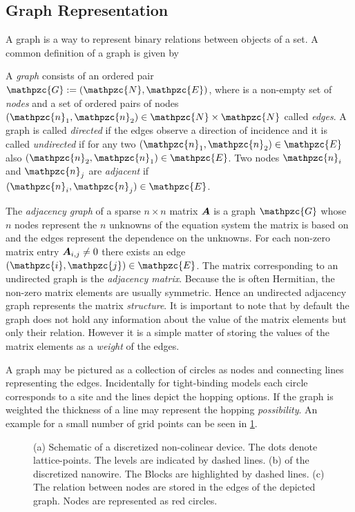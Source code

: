 \subsection{Graph Representation}
A graph is a way to represent binary relations between objects of a set. A common definition of a graph is given by
\begin{dfn}
A \emph{graph}  consists of an ordered pair $\mathpzc{G} :=(\mathpzc{N},\mathpzc{E})$, where  is a non-empty set of \emph{nodes}  and  a set of ordered pairs of nodes $(\mathpzc{n}_1,\mathpzc{n}_2) \in \mathpzc{N} \times \mathpzc{N}$ called \emph{edges}.
A graph is called \emph{directed} if the edges observe a direction of incidence  and it is called \emph{undirected} if for any two $(\mathpzc{n}_1,\mathpzc{n}_2) \in \mathpzc{E}$ also $(\mathpzc{n}_2,\mathpzc{n}_1) \in \mathpzc{E}$.
Two nodes $\mathpzc{n}_i$ and $\mathpzc{n}_j$ are \emph{adjacent} if $(\mathpzc{n}_i,\mathpzc{n}_j) \in \mathpzc{E}$. \cite{graham1995handbook}
\end{dfn}
The \emph{adjacency graph} of a sparse $n \times n$ matrix $\boldsymbol{A}$ is a graph $\mathpzc{G}$ whose $n$ nodes represent the $n$ unknowns of the equation system the matrix is based on and the edges represent the dependence on the unknowns. For each non-zero matrix entry $\boldsymbol{A}_{i,j}\neq 0$ there exists an edge $(\mathpzc{i},\mathpzc{j}) \in \mathpzc{E}$. The matrix corresponding to an undirected graph is the \emph{adjacency matrix}. Because the \hamil{} is often Hermitian, the non-zero matrix elements are usually symmetric. Hence an undirected adjacency graph represents the matrix \emph{structure}. It is important to note that by default the graph does not hold any information about the value of the matrix elements but only their relation. However it is a simple matter of storing the values of the matrix elements as a \emph{weight} of the edges.\par
A graph may be pictured as a collection of circles as nodes and connecting lines representing the edges. Incidentally for tight-binding models each circle corresponds to a site and the lines depict the hopping options. If the graph is weighted the thickness of a line may represent the hopping \emph{possibility}. An example for a small number of grid points can be seen in \cref{fig:matrixtograph}.
\begin{figure}[!h]
\centering
{}
\caption{(a) Schematic of a discretized non-colinear device. The dots denote lattice-points. The levels are indicated by dashed lines. (b) \hamil{} of the discretized nanowire. The Blocks are highlighted by dashed lines. (c) The relation between nodes are stored in the edges of the depicted graph. Nodes are represented as red circles.}
\label{fig:matrixtograph}
\end{figure}
